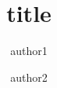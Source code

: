 \documentclass[18pt]{beamer}
\title{title}
\author{\vspace*{-1cm}}
\institute{\vspace*{-1cm}}
\author{
        author1
        \and
        author2
    }
\begin{document}

\normalfont
\vspace*{-1cm}

\begin{frame}
    \titlepage
\end{frame}





\appendix


\end{document}
